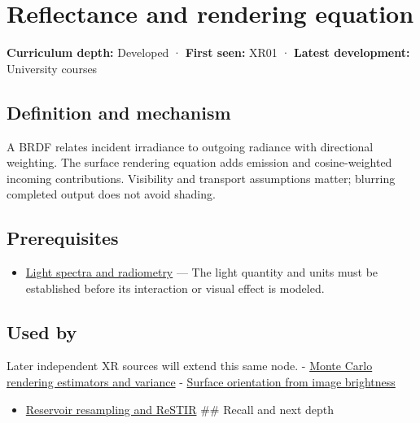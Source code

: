 \hypertarget{appendix-96da0b153b77}{}\label{referencestart:appendix-96da0b153b77}
\section{Reflectance and rendering equation}\label{appendix-96da0b153b77-reflectance-and-rendering-equation}

\textbf{Curriculum depth:} Developed · \textbf{First seen:} XR01 · \textbf{Latest development:} University courses

\subsection{Definition and mechanism}\label{appendix-96da0b153b77-definition-and-mechanism}

A BRDF relates incident irradiance to outgoing radiance with directional weighting. The surface rendering equation adds emission and cosine-weighted incoming contributions. Visibility and transport assumptions matter; blurring completed output does not avoid shading.

\subsection{Prerequisites}\label{appendix-96da0b153b77-prerequisites}

\begin{itemize}
\tightlist
\item
  \hyperref[appendix-215c2570199b]{Light spectra and radiometry} --- The light quantity and units must be established before its interaction or visual effect is modeled.
\end{itemize}

\subsection{Used by}\label{appendix-96da0b153b77-used-by}

Later independent XR sources will extend this same node. - \hyperref[appendix-031e02bf28af]{Monte Carlo rendering estimators and variance} - \hyperref[appendix-89b2d5b7c9e1]{Surface orientation from image brightness}

\begin{itemize}
\tightlist
\item
  \hyperref[appendix-68be451b78b1]{Reservoir resampling and ReSTIR} \#\# Recall and next depth
\end{itemize}

